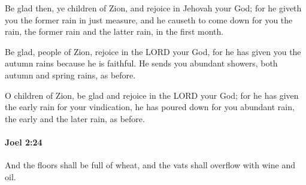 			\begin{versebox}
					\item[BHS] 
					\item[LXX] 
					\item[ASV] Be glad then, ye children of Zion, and rejoice in Jehovah your God; for he giveth you the former rain in just measure, and he causeth to come down for you the rain, the former rain and the latter rain, in the first month.
					\item[NIV] Be glad, people of Zion, rejoice in the LORD your God, for he has given you the autumn rains because he is faithful. He sends you abundant showers, both autumn and spring rains, as before.
					\item[NRSV] O children of Zion, be glad and rejoice in the LORD your God; for he has given the early rain for your vindication, he has poured down for you abundant rain, the early and the later rain, as before.
			\end{versebox}

		\paragraph{Joel 2:24} %
			\label{JOEL-2-24}

			And the floors shall be full of wheat, and the vats shall overflow with wine and oil.

